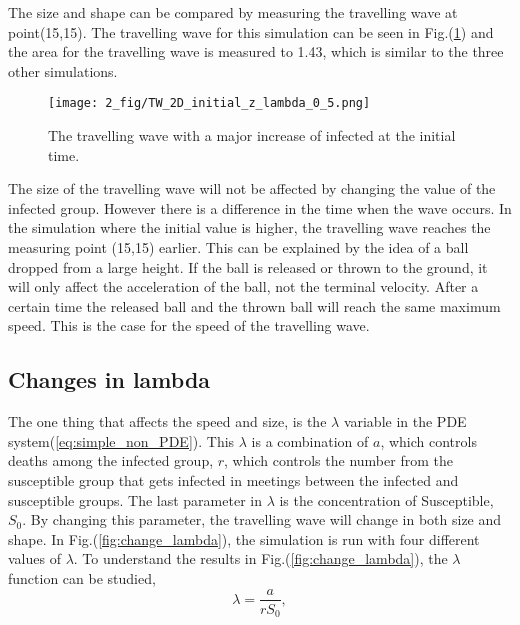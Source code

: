 \documentclass[%
twoside,                 %
final,                   %
chapterprefix=true,      %
open=right               %
10pt]{book}
\begin{document}
\vspace{3mm}




\vspace{3mm}


The size and shape can be compared by measuring the travelling wave at point(15,15). The travelling wave for this simulation can be seen in Fig.(\ref{fig:initial_trav_wave}) and the area for the travelling wave is measured to 1.43, which is similar to the three other simulations.


\begin{figure}[ht]
  \centerline{\texttt{[image: 2\_fig/TW\_2D\_initial\_z\_lambda\_0\_5.png]}}
  \caption{
  \label{fig:initial_trav_wave} The travelling wave with a major increase of infected at the initial time.
  }
\end{figure}




\vspace{3mm}




\vspace{3mm}


The size of the travelling  wave will not be affected by changing the value of the infected group. However there is a difference in the time when the wave occurs. In the simulation where the initial value is higher, the travelling wave reaches the measuring point (15,15) earlier. This can be explained by the idea of a ball dropped from a large height. If the ball is released or thrown to the ground, it will only affect the acceleration of the ball, not the terminal velocity. After a certain time the released ball and the thrown ball will reach the same maximum speed. This is the case for the speed of the travelling wave. 
\subsection{Changes in lambda}
The one thing that affects the speed and size, is the $\lambda$ variable in the PDE system(\ref{eq:simple_non_PDE}). This $\lambda$ is a combination of $a$, which controls deaths among the infected group, $r$, which controls the number from the susceptible group that gets infected in meetings between the infected and susceptible groups. The last parameter in $\lambda$ is the concentration of Susceptible, $S_0$. By changing this parameter, the travelling wave will change in both size and shape. In Fig.(\ref{fig:change_lambda}), the simulation is run with four different values of $\lambda$. To understand the results in Fig.(\ref{fig:change_lambda}), the $\lambda $ function can be studied,
\begin{equation} \label{eq:lambda}
 \lambda =\frac{a}{rS_0},
\end{equation}
\end{document}
